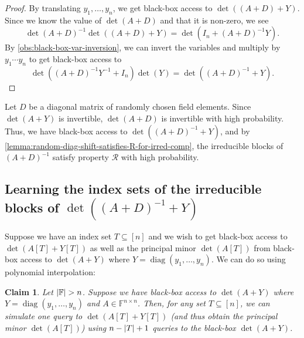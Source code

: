 \documentclass[11pt,letterpaper]{article}
\DeclarePairedDelimiter{\card}{|}{|}
\DeclareMathOperator*{\diag}{diag}
\newcommand{\F}{\mathbb{F}}
\newtheorem{claim}{Claim}[section]
\newcommand{\prop}{\mathcal{R}}
\begin{document}
{{{\begin{proof}
By translating $y_1,\dots,y_n$, we get black-box access to $\det((A+D) + Y)$. Since we know the value of $\det(A+D)$ and that it is non-zero, we see
\[\det(A+D)^{-1}\det((A+D) + Y) = \det(I_n + (A+D)^{-1}Y)\text{.}\]
By \cref{obs:black-box-var-inversion}, we can invert the variables and multiply by $y_1\cdots y_n$ to get black-box access to
\[\det((A+D)^{-1}Y^{-1} + I_n)\det(Y) = \det((A+D)^{-1} + Y)\text{.}\]
\end{proof}

Let $D$ be a diagonal matrix of randomly chosen field elements. Since $\det(A+Y)$ is invertible, $\det(A+D)$ is invertible with high probability. Thus, we have black-box access to $\det((A+D)^{-1} + Y)$, and by \cref{lemma:random-diag-shift-satisfies-R-for-irred-comp}, the irreducible blocks of $(A+D)^{-1}$ satisfy property $\prop$ with high probability.

\subsection{Learning the index sets of the irreducible blocks of \texorpdfstring{$\det((A + D)^{-1} + Y)$}{det(adj(A+D)^(-1) + Y)}} \label{sec:access to irreduble blocks}

Suppose we have an index set $T \subseteq [n]$ and we wish to get black-box access to $\det(A[T] + Y[T])$ as well as the principal minor $\det(A[T])$ from black-box access to $\det(A+Y)$ where $Y = \diag(y_1,\dots,y_n)$. We can do so using polynomial interpolation:

\begin{claim}\label{claim:bba-to-pm-oracle}
    Let $\card{\F} > n$. Suppose we have black-box access to $\det(A+Y)$ where $Y = \diag(y_1,\dots,y_n)$ and $A \in \F^{n \times n}$. Then, for any set $T \subseteq [n]$, we can simulate one query to $\det(A[T] + Y[T])$ (and thus obtain the principal minor $\det(A[T])$) using $n-\card{T}+1$ queries to the black-box $\det(A+Y)$.
\end{claim}

}}}
\end{document}

